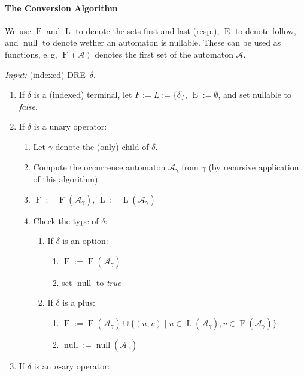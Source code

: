 \documentclass[a4paper,11pt, svgnames,titlepage]{article}
\newcommand{\df}{:=}
\DeclareMathOperator{\first}{F}
\DeclareMathOperator{\last}{L}
\DeclareMathOperator{\follow}{E}
\DeclareMathOperator{\nullable}{null}
\begin{document}
\paragraph{The Conversion Algorithm}
We use $\first$ and $\last$ to denote the sets first and last (resp.), $\follow$ to denote follow, and $\nullable$ to denote wether an automaton is nullable. These can be used as functions, e.\,g, $\first(\mathcal{A})$ denotes the first set of the automaton $\mathcal{A}$.

\emph{Input:} (indexed) DRE~$\delta$.
\begin{enumerate}
	\item If $\delta$ is a (indexed) terminal, let $F\df L\df \{\delta\}$, $\follow\df\emptyset$, and set nullable to \emph{false}.
	\item If $\delta$ is a unary operator:
	\begin{enumerate}[label*=\arabic*.]
		\item Let $\gamma$ denote the (only) child of $\delta$.
		\item Compute the occurrence automaton $\mathcal{A}_{\gamma}$ from $\gamma$ (by recursive application of this algorithm).
		\item $\first\df \first(\mathcal{A}_{\gamma})$, $\last\df \last(\mathcal{A}_{\gamma})$
		\item Check the type of $\delta$:
		\begin{enumerate}[label*=\arabic*.]
			\item If $\delta$ is an option: 
			\begin{enumerate}[label*=\arabic*.]
				\item $\follow\df \follow(\mathcal{A}_{\gamma})$
				\item set $\nullable$ to \emph{true}
			\end{enumerate}
			\item If $\delta$ is a plus:
			\begin{enumerate}[label*=\arabic*.]
				\item $\follow\df \follow(\mathcal{A}_{\gamma})\cup \{(u,v)\mid u\in\last(\mathcal{A}_{\gamma}), v\in\first(\mathcal{A}_{\gamma})\}$
				\item $\nullable\df\nullable(\mathcal{A}_{\gamma})$
			\end{enumerate}
		\end{enumerate}
	\end{enumerate}
	\item If $\delta$ is an $n$-ary operator:
	\begin{enumerate}[label*=\arabic*.]

\end{enumerate}
\end{enumerate}
\end{document}
